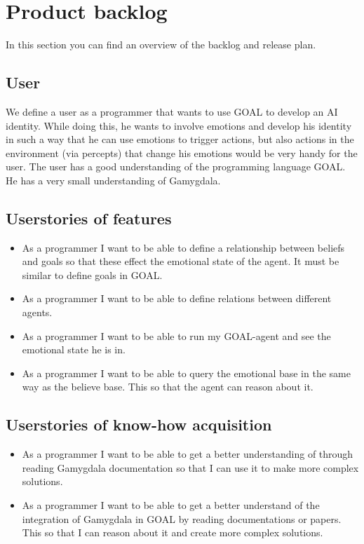 \documentclass[]{article}
\begin{document}
\section{Product backlog}
In this section you can find an overview of the backlog and release plan.
\subsection{User}
We define a user as a programmer that wants to use GOAL to develop an AI identity. While doing this, he wants to involve emotions and develop his identity in such a way that he can use emotions to trigger actions, but also actions in the environment (via percepts) that change his emotions would be very handy for the user. The user has a good understanding of the programming language GOAL. He has a very small understanding of Gamygdala.
\subsection{Userstories of features}
\begin{itemize}
\item As a programmer I want to be able to define a relationship between beliefs and goals so that these effect the emotional state of the agent. It must be similar to define goals in GOAL.

\item As a programmer I want to be able to define relations between different agents.

\item As a programmer I want to be able to run my GOAL-agent and see the emotional state he is in.

\item As a programmer I want to be able to query the emotional base in the same way as the believe base. This so that the agent can reason about it.
\end{itemize}

\subsection{Userstories of know-how acquisition}
\begin{itemize}
\item As a programmer I want to be able to get a better understanding of through reading Gamygdala documentation so that I can use it to make more complex solutions.

\item As a programmer I want to be able to get a better understand of the integration of Gamygdala in GOAL by reading documentations or papers. This so that I can reason about it and create more complex solutions.
\end{itemize}
\end{document}
